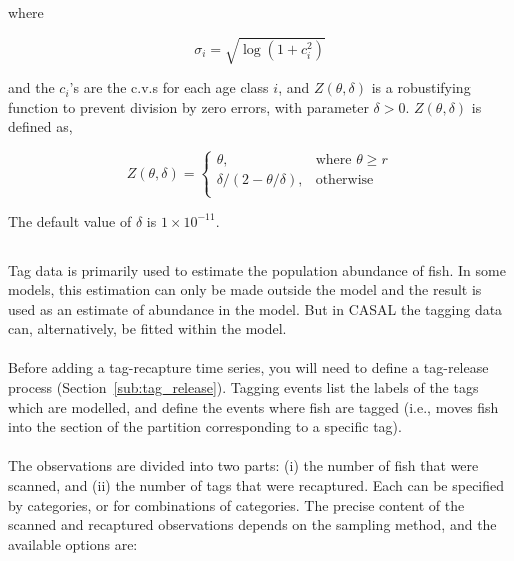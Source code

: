 {{{{where 

\begin{equation}
  \sigma_i  = \sqrt{\log \left(1+c_i^2 \right)}
\end{equation}

and the $c_i$'s are the c.v.s for each age class $i$, and $Z \left(\theta,\delta \right)$ is a robustifying function to prevent division by zero errors, with parameter $\delta>0$. $Z \left(\theta,\delta \right)$ is defined as,

\begin{equation}
   Z \left(\theta,\delta \right) = \begin{cases}
	  \theta, & \text{where $\theta \ge r$} \\
	  \delta/\left( 2-\theta/\delta \right), & \text{otherwise} \\  
  \end{cases}
\end{equation}

The default value of $\delta$ is $1 \times 10^{-11}$.

\subsection{\label{sec:tag-recapture-by-length}}

Tag data is primarily used to estimate the population abundance of fish. In some models, this estimation can only be made outside the model and the result is used as an estimate of abundance in the model. But in CASAL the tagging data can, alternatively, be fitted within the model.
\\\\
Before adding a tag-recapture time series, you will need to define a tag-release process (Section~\ref{sub:tag_release}). Tagging events list the labels of the tags which are modelled, and define the events where fish are tagged (i.e., \CNAME moves fish into the section of the partition corresponding to a specific tag).
\\\\
The observations are divided into two parts: (i) the number of fish that were scanned, and (ii) the number of tags that were recaptured. Each can be specified by categories, or for combinations of categories. The precise content of the scanned and recaptured observations depends on the sampling method, and the available options are:

}}}}
